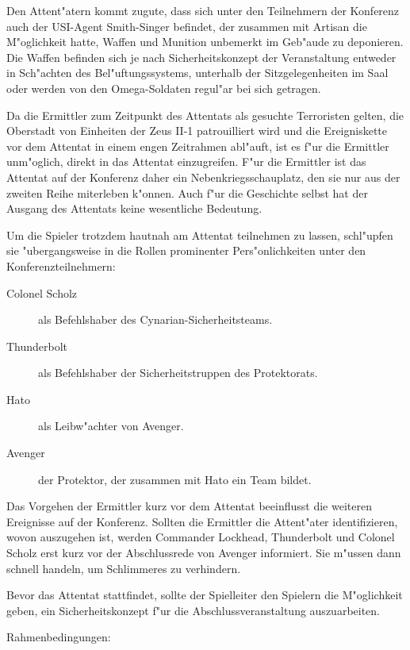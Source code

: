 Den Attent"atern kommt zugute, dass sich unter den Teilnehmern der Konferenz auch der USI-Agent Smith-Singer befindet, der zusammen mit Artisan die M"oglichkeit hatte, Waffen und Munition unbemerkt im Geb"aude zu deponieren. Die Waffen befinden sich je nach Sicherheitskonzept der Veranstaltung entweder in Sch"achten des Bel"uftungssystems, unterhalb der Sitzgelegenheiten im Saal oder werden von den Omega-Soldaten regul"ar bei sich getragen.

Da die Ermittler zum Zeitpunkt des Attentats als gesuchte Terroristen gelten, die Oberstadt von Einheiten der Zeus II-1 patrouilliert wird und die Ereigniskette vor dem Attentat in einem engen Zeitrahmen abl"auft, ist es f"ur die Ermittler unm"oglich, direkt in das Attentat einzugreifen. F"ur die Ermittler ist das Attentat auf der Konferenz daher ein Nebenkriegsschauplatz, den sie nur aus der zweiten Reihe miterleben k"onnen. Auch f"ur die Geschichte selbst hat der Ausgang des Attentats keine wesentliche Bedeutung.

Um die Spieler trotzdem hautnah am Attentat teilnehmen zu lassen, schl"upfen sie "ubergangsweise in die Rollen prominenter Pers"onlichkeiten unter den Konferenzteilnehmern:

\begin{description}
	\item[Colonel Scholz] als Befehlshaber des Cynarian-Sicherheitsteams.
	\item[Thunderbolt] als Befehlshaber der Sicherheitstruppen des Protektorats.
	\item[Hato] als Leibw"achter von Avenger.
	\item[Avenger] der Protektor, der zusammen mit Hato ein Team bildet.
\end{description}

Das Vorgehen der Ermittler kurz vor dem Attentat beeinflusst die weiteren Ereignisse auf der Konferenz. Sollten die Ermittler die Attent"ater identifizieren, wovon auszugehen ist, werden Commander Lockhead, Thunderbolt und Colonel Scholz erst kurz vor der Abschlussrede von Avenger informiert. Sie m"ussen dann schnell handeln, um Schlimmeres zu verhindern.

Bevor das Attentat stattfindet, sollte der Spielleiter den Spielern die M"oglichkeit geben, ein Sicherheitskonzept f"ur die Abschlussveranstaltung auszuarbeiten.

Rahmenbedingungen:

